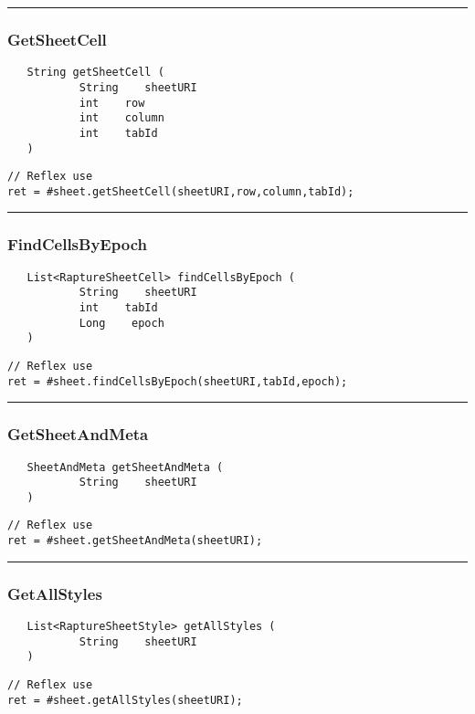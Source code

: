 \rule{15cm}{2pt}
\subsubsection{GetSheetCell}
\label{Api:GetSheetCell}
\begin{verbatim}
   String getSheetCell (
           String    sheetURI
           int    row
           int    column
           int    tabId
   )
\end{verbatim}
\begin{lstlisting}[language=reflex]
// Reflex use
ret = #sheet.getSheetCell(sheetURI,row,column,tabId);
\end{lstlisting}



\rule{15cm}{2pt}
\subsubsection{FindCellsByEpoch}
\label{Api:FindCellsByEpoch}
\begin{verbatim}
   List<RaptureSheetCell> findCellsByEpoch (
           String    sheetURI
           int    tabId
           Long    epoch
   )
\end{verbatim}
\begin{lstlisting}[language=reflex]
// Reflex use
ret = #sheet.findCellsByEpoch(sheetURI,tabId,epoch);
\end{lstlisting}



\rule{15cm}{2pt}
\subsubsection{GetSheetAndMeta}
\label{Api:GetSheetAndMeta}
\begin{verbatim}
   SheetAndMeta getSheetAndMeta (
           String    sheetURI
   )
\end{verbatim}
\begin{lstlisting}[language=reflex]
// Reflex use
ret = #sheet.getSheetAndMeta(sheetURI);
\end{lstlisting}



\rule{15cm}{2pt}
\subsubsection{GetAllStyles}
\label{Api:GetAllStyles}
\begin{verbatim}
   List<RaptureSheetStyle> getAllStyles (
           String    sheetURI
   )
\end{verbatim}
\begin{lstlisting}[language=reflex]
// Reflex use
ret = #sheet.getAllStyles(sheetURI);
\end{lstlisting}



